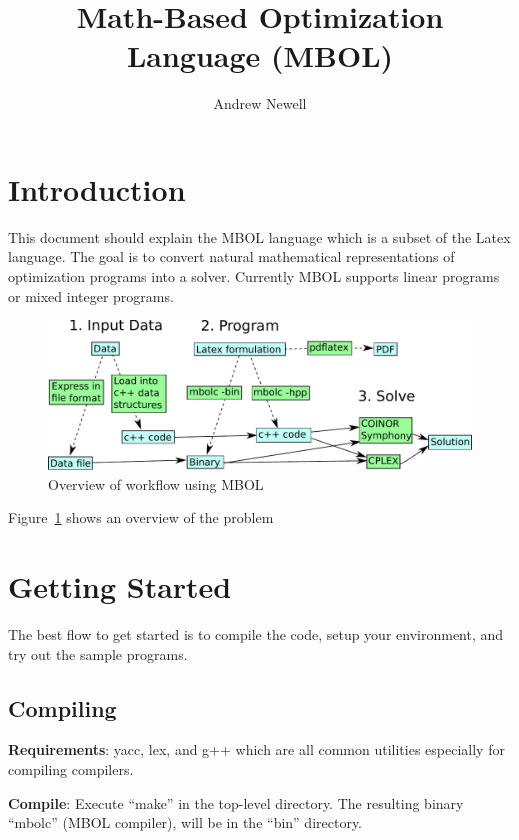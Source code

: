 \documentclass{article}
\begin{document}
\title{Math-Based Optimization Language (MBOL)}

\author{Andrew Newell}

\maketitle

\tableofcontents

\section{Introduction}

This document should explain the MBOL language which is a subset of the Latex language. The goal is to convert natural mathematical representations of optimization programs into a solver. Currently MBOL supports linear programs or mixed integer programs.

\begin{figure}
    \includegraphics[width=\textwidth]{figures/mbol-overview.pdf}
    \caption{Overview of workflow using MBOL}
    \label{lab:overview}
\end{figure}

Figure~\ref{lab:overview} shows an overview of the problem

\section{Getting Started}

The best flow to get started is to compile the code, setup your environment, and try out the sample programs.

\subsection{Compiling}

\textbf{Requirements}: yacc, lex, and g++ which are all common utilities especially for compiling compilers.

\textbf{Compile}: Execute ``make'' in the top-level directory. The resulting binary ``mbolc'' (MBOL compiler), will be in the ``bin'' directory.
\end{document}
